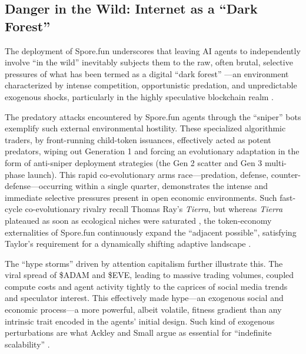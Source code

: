 \subsection{Danger in the Wild: Internet as a ``Dark Forest''}

The deployment of Spore.fun underscores that leaving AI agents to independently involve ``in the wild'' inevitably subjects them to the raw, often brutal, selective pressures of what has been termed as a digital ``dark forest'' \cite{TheDarkForestCollective2024Dark}—an environment characterized by intense competition, opportunistic predation, and unpredictable exogenous shocks, particularly in the highly speculative blockchain realm \cite{Qin2022Quantifying,Wu2025Hunting}.

The predatory attacks encountered by Spore.fun agents through the ``sniper'' bots \cite{Cernera2023Token} exemplify such external environmental hostility. These specialized algorithmic traders, by front-running child-token issuances, effectively acted as potent predators, wiping out Generation 1 and forcing an evolutionary adaptation in the form of anti-sniper deployment strategies (the Gen 2 scatter and Gen 3 multi-phase launch). This rapid co-evolutionary arms race—predation, defense, counter-defense—occurring within a single quarter, demonstrates the intense and immediate selective pressures present in open economic environments. 
Such fast-cycle co-evolutionary rivalry recall Thomas Ray's \textit{Tierra}, but whereas \textit{Tierra} plateaued as soon as ecological niches were saturated \cite{ray1996approach}, the token-economy externalities of Spore.fun continuously expand the ``adjacent possible'', satisfying Taylor's requirement for a dynamically shifting adaptive landscape \cite{taylor2012exploring}.

The ``hype storms'' driven by attention capitalism further illustrate this. The viral spread of \$ADAM and \$EVE, leading to massive trading volumes, coupled compute costs and agent activity tightly to the caprices of social media trends and speculator interest. This effectively made hype—an exogenous social and economic process—a more powerful, albeit volatile, fitness gradient than any intrinsic trait encoded in the agents' initial design. Such kind of exogenous perturbations are what Ackley and Small argue as essential for “indefinite scalability” \cite{ackley2014indefinitely}.

